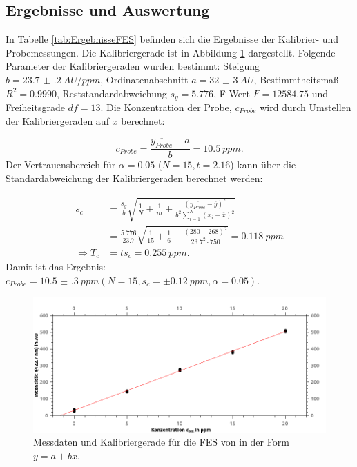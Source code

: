\subsection{Ergebnisse und Auswertung} \label{sec:ErgebnisseFES}
  
  In Tabelle \ref{tab:ErgebnisseFES} befinden sich die Ergebnisse der Kalibrier- und Probemessungen. Die Kalibriergerade ist in Abbildung \ref{fig:KalibriergeradeEisen} dargestellt. Folgende Parameter der Kalibriergeraden wurden bestimmt: Steigung $b = \SI[mode=text,separate-uncertainty]{23.7(2)}{AU\per ppm}$, Ordinatenabschnitt $a = \SI[mode=text,separate-uncertainty]{32(3)}{AU}$, Bestimmtheitsmaß $R^2 = 0.9990$, Reststandardabweichung $s_y = 5.776$, F-Wert $F = 12584.75$ und Freiheitsgrade $df = 13$. Die Konzentration der Probe, $c_{Probe}$ wird durch Umstellen der Kalibriergeraden auf $x$ berechnet:
  
    \begin{equation}
      c_{Probe} = \frac{\overline{y_{Probe}} - a}{b} = \SI[mode=text]{10.5}{ppm}.
    \end{equation}
  Der Vertrauensbereich für $\alpha = 0.05$ ($N = 15, t = 2.16$) kann über die Standardabweichung der Kalibriergeraden berechnet werden:
  
    \begin{equation}
      \begin{split}
        s_c &= \frac{s_y}{b} \sqrt{\frac{1}{N} + \frac{1}{m} + \frac{\left(\overline{y_{Probe}} - \overline{y}\right)^2}{b^2 \sum_{i=1}^N \left(x_i - \overline{x}\right)^2}} \\
            &= \frac{5.776}{23.7} \sqrt{\frac{1}{15} + \frac{1}{6} + \frac{\left(280 - 268\right)^2}{23.7^2 \cdot 750}} = \SI[mode=text]{0.118}{ppm} \\
     \Rightarrow T_c &= t s_c = \SI[mode=text]{0.255}{ppm}.
      \end{split}
    \end{equation}
  Damit ist das Ergebnis: $c_{Probe} = \SI[mode=text, multi-part-units = brackets, separate-uncertainty]{10.5(3)}{ppm} \left(N = 15, s_c = \pm \SI[mode=text]{0.12}{ppm}, \alpha = 0.05\right)$.
  
  \begin{figure}[H]
    \includegraphics[scale=0.5, center]{images/KalibriergeradeFESCa.png} 
    \caption[Messdaten und Kalibriergerade für die FES von , Quelle: Autor]{Messdaten und Kalibriergerade für die FES von  in der Form $y = a + bx$.}
    \label{fig:KalibriergeradeEisen}
  \end{figure}
  
